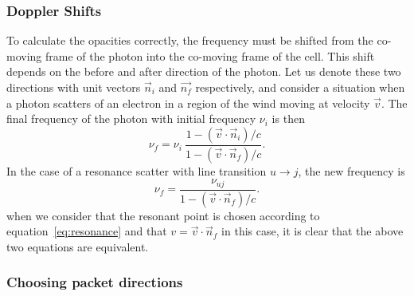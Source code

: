 \subsubsection{Doppler Shifts}

To calculate the opacities correctly, the frequency must be shifted from
the co-moving frame of the photon into the co-moving frame of the cell.
This shift depends on the before and after direction of the photon. Let us denote
these two directions with unit vectors $\vec{n}_i$ and $\vec{n_f}$ respectively,
and consider a situation when a photon scatters of an electron in a region of the
wind moving at velocity $\vec{v}$.
The final frequency of the photon with initial frequency $\nu_i$ is then 
\begin{equation}
\nu_f = \nu_i ~\frac{1 - (\vec{v} \cdot \vec{n}_i) / c}{1 - (\vec{v} \cdot \vec{n}_f) / c}.
\end{equation}
In the case of a resonance scatter with line transition $u \rightarrow j$, the 
new frequency is
\begin{equation}
\nu_f = \frac{\nu_{uj}}{1 - (\vec{v} \cdot \vec{n}_f) / c}.
\end{equation}
when we consider that the resonant point is chosen according to 
equation~\ref{eq:resonance} and that $v=\vec{v} \cdot \vec{n}_f$ in this case,
it is clear that the above two equations are equivalent.


\subsubsection{Choosing packet directions}

